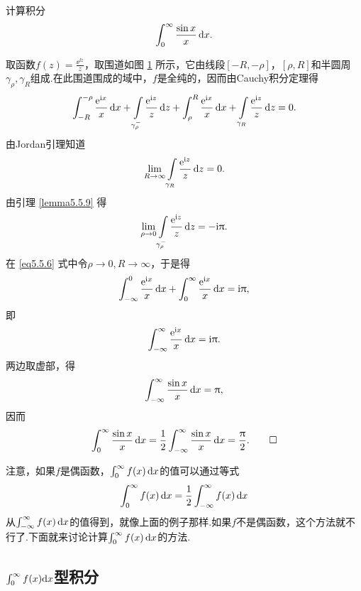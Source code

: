 \begin{example}\label{exam5.5.10}
  计算积分
  \[
    \int_0^\infty\frac{\sin x}x\mathop{}\!\mathrm dx.
  \]
\end{example}
\begin{figure}[!ht]
  \centering
  \caption{\label{fig5.3}}
\end{figure}
\begin{solution}
  取函数$f(z)=\frac{\ee^{\ii z}}z$，取围道如图 \ref{fig5.3} 所示，它由线段$[-R,-\rho]$，$[\rho,R]$和半圆周$\gamma_\rho,\gamma_R$组成.在此围道围成的域中，$f$是全纯的，因而由Cauchy积分定理得
  \begin{equation}\label{eq5.5.6}
    \int_{-R}^{-\rho}\frac{\ee^{\ii x}}x\dx+\int\limits_{\gamma_\rho^-}\frac{\ee^{\ii z}}z\dz+\int_\rho^R\frac{\ee^{\ii x}}x\dx+\int\limits_{\gamma_R}\frac{\ee^{\ii z}}z\dz=0.
  \end{equation}
  由Jordan引理知道
  \[
    \lim_{R\to\infty}\int\limits_{\gamma_R}\frac{\operatorname{\!\!\;\mathrm e}^{\mathrm i z}}z\mathop{}\!\mathrm dz = 0.
  \]
  由引理 \ref{lemma5.5.9} 得
  \[
    \lim_{\rho\to0}\int\limits_{\gamma_\rho^-}\frac{\operatorname{\!\!\;\mathrm e}^{\mathrm i z}}z\mathop{}\!\mathrm dz = -\mathrm i\uppi.
  \]
  在 \eqref{eq5.5.6} 式中令$\rho\to0,R\to\infty$，于是得
  \[
    \int_{-\infty}^0\frac{\operatorname{\!\!\;\mathrm e}^{\mathrm i x}}x\mathop{}\!\mathrm dx+\int_0^\infty\frac{\operatorname{\!\!\;\mathrm e}^{\mathrm i x}}x\mathop{}\!\mathrm dx = \mathrm i\uppi,
  \]
  即
  \[
    \int_{-\infty}^\infty\frac{\operatorname{\!\!\;\mathrm e}^{\mathrm i x}}x\mathop{}\!\mathrm dx = \mathrm i\uppi.
  \]
  两边取虚部，得
  \[
    \int_{-\infty}^\infty\frac{\sin x}x\mathop{}\!\mathrm dx = \uppi,
  \]
  因而
  \begin{equation*}
    \int_0^\infty\frac{\sin x}x\mathop{}\!\mathrm dx = \frac12\int_{-\infty}^\infty\frac{\sin x}x\mathop{}\!\mathrm dx = \frac{\uppi}2. \qedhere
  \end{equation*}
\end{solution}

注意，如果$f$是偶函数，$\int_0^\infty f(x)\mathop{}\!\mathrm dx$的值可以通过等式
\[
  \int_0^\infty f(x)\mathop{}\!\mathrm dx = \frac12\int_{-\infty}^\infty f(x)\mathop{}\!\mathrm dx
\]
从$\int_{-\infty}^\infty f(x)\mathop{}\!\mathrm dx$的值得到，就像上面的例子那样.如果$f$不是偶函数，这个方法就不行了.下面就来讨论计算$\int_0^\infty f(x)\mathop{}\!\mathrm dx$的方法.

\subsection{\mbox{$\int_0^\infty f(x){\normalfont\mathop{}\!\mathrm{d} }x$}型积分\protect\hypertarget{sec5.5.2}{}}


